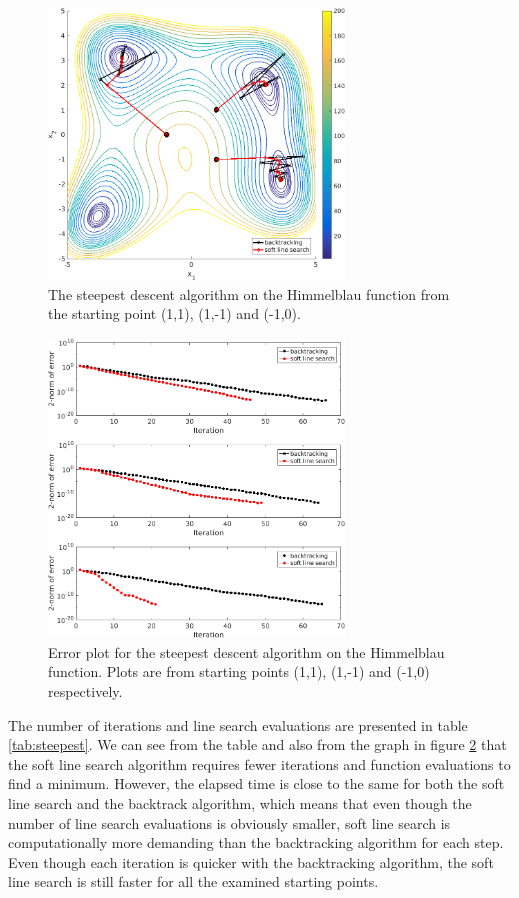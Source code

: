 \begin{figure}[htb]
\centering
\includegraphics[width=0.7\textwidth]{../img/steepestDescent}
\caption{The steepest descent algorithm on the Himmelblau function from the starting point (1,1), (1,-1) and (-1,0).}
\label{fig:steepest}
\end{figure}

\begin{figure}[htb]
\centering
\includegraphics[width=0.7\textwidth]{../img/steepestDescentError}
\caption{Error plot for the steepest descent algorithm on the Himmelblau function. Plots are from starting points (1,1), (1,-1) and (-1,0) respectively.}
\label{fig:rateConvSteepest}
\end{figure}


The number of iterations and line search evaluations are presented in table \ref{tab:steepest}. We can see from the table and also from the graph in figure \ref{fig:rateConvSteepest} that the soft line search algorithm requires fewer iterations and function evaluations to find a minimum. However, the elapsed time is close to the same for both the soft line search and the backtrack algorithm, which means that even though the number of line search evaluations is obviously smaller, soft line search is computationally more demanding than the backtracking algorithm for each step. Even though each iteration is quicker with the backtracking algorithm, the soft line search is still faster for all the examined starting points.

